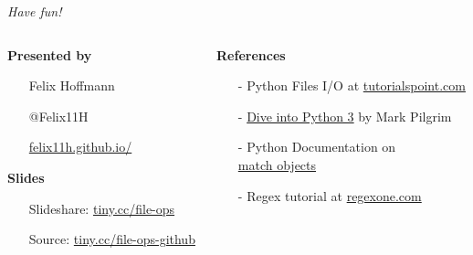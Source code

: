 
\begin{frame}[fragile]
  \begin{center} 
    \LARGE \textit{Have fun!}
  \end{center}
  
  \vspace{0.55cm}

  \begin{columns}[t]
    \begin{column}{0.4\textwidth}        
      \textbf{Presented by}
      \normalsize
      \vspace{0.18cm}
      \begin{itemize}%
        \setlength{\itemindent}{-0.3cm}
        \item[] Felix Hoffmann
        \item[] @Felix11H
        \item[] \href{http://felix11h.github.io/}{felix11h.github.io/}
      \end{itemize}

      \vspace{0.38cm}
      \textbf{Slides}
      \normalsize
      \vspace{0.18cm}
      \begin{itemize}%
        \setlength{\itemindent}{-0.1cm}
        \item[] Slideshare: %
          \href{http://tiny.cc/file-ops}{tiny.cc/file-ops}
        \item[] Source: %
          \href{http://tiny.cc/file-ops-github}{tiny.cc/file-ops-github}
      \end{itemize}
    \end{column}
    \begin{column}{0.64\textwidth}
      \textbf{References}
      \vspace{0.28cm}
      \normalsize 
      \begin{itemize}%
        \itemsep8pt
        \item[-] Python Files I/O at \href{http://www.tutorialspoint.com/python/python_files_io.htm}{tutorialspoint.com}
        \item[-] \href{%
            http://www.diveintopython3.net/regular-expressions.html}{%
              Dive into Python 3} by Mark Pilgrim
        \item[-] Python Documentation on\\
          \href{https://docs.python.org/2/library/re.html#match-objects}{%
            match objects} 
        \item[-] Regex tutorial at \href{http://regexone.com/}{regexone.com}
          

\end{itemize}
\end{column}
\end{columns}
\end{frame}
